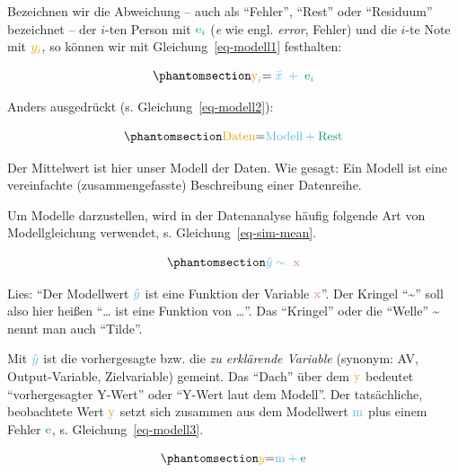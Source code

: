 \documentclass[
  letterpaper,
]{scrbook}
\theoremstyle{definition}
\theoremstyle{definition}
\theoremstyle{definition}
\theoremstyle{remark}
\begin{document}
Bezeichnen wir die Abweichung -- auch als \enquote{Fehler},
\enquote{Rest} oder \enquote{Residuum} bezeichnet -- der \(i\)-ten
Person mit \(\color{errorcol}{\text{e}_i}\) (\emph{e} wie engl.
\emph{error}, Fehler) und die \(i\)-te Note mit \(\color{ycol}{y_i}\),
so können wir mit Gleichung~\ref{eq-modell1} festhalten:

\begin{equation}\phantomsection\label{eq-modell1}{\color{ycol}{\text{y}_i} \color{black}{ = } \color{modelcol}{\;\bar{x}\;} + \color{errorcol}{\;\text{e}_i}}\end{equation}

Anders ausgedrückt (s. Gleichung~\ref{eq-modell2}):

\begin{equation}\phantomsection\label{eq-modell2}{\color{ycol}{\text{Daten}} \color{black}{ = } \color{modelcol}{\text{Modell}} + 
\color{errorcol}{\text{Rest}}}\end{equation}

Der Mittelwert ist hier unser Modell der Daten. Wie gesagt: Ein Modell
ist eine vereinfachte (zusammengefasste) Beschreibung einer Datenreihe.

Um Modelle darzustellen, wird in der Datenanalyse häufig folgende Art
von Modellgleichung verwendet, s. Gleichung~\ref{eq-sim-mean}.

\begin{equation}\phantomsection\label{eq-sim-mean}{\color{modelcol}{\hat{y}} \sim \color{xcol}{\text{ x}}}\end{equation}

Lies: \enquote{Der Modellwert \(\color{modelcol}{\hat{y}}\) ist eine
Funktion der Variable \(\color{xcol}{\text{x}}\)}. Der Kringel
\enquote{\textasciitilde{}} soll also hier heißen \enquote{\ldots{} ist
eine Funktion von \ldots{}}. Das \enquote{Kringel} oder die
\enquote{Welle} \textasciitilde{} nennt man auch \enquote{Tilde}.

Mit \(\color{modelcol}{\hat{y}}\) ist die vorhergesagte bzw. die
\emph{zu erklärende Variable} (synonym: AV, Output-Variable,
Zielvariable) gemeint. Das \enquote{Dach} über dem
\(\color{ycol}{\text{y}}\) bedeutet \enquote{vorhergesagter Y-Wert} oder
\enquote{Y-Wert laut dem Modell}. Der tatsächliche, beobachtete Wert
\(\color{ycol}{\text{y}}\) setzt sich zusammen aus dem Modellwert
\(\color{modelcol}{\text{m}}\) plus einem Fehler
\(\color{errorcol}{\text{e}}\), s. Gleichung~\ref{eq-modell3}.

\begin{equation}\phantomsection\label{eq-modell3}{\color{ycol}{y} \color{black}{ = } \color{modelcol}{\text{m}} + \color{errorcol}{\text{e}}}\end{equation}
\end{document}
